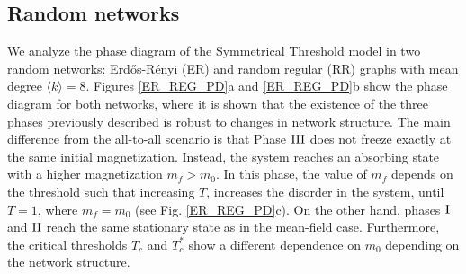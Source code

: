 \subsection{Random networks}

We analyze the phase diagram of the Symmetrical Threshold model in two random networks: Erd\H{o}s-Rényi (ER) \cite{erdos1960evolution} and random regular (RR) \cite{wormald_1999} graphs with mean degree $\langle k \rangle = 8$. Figures \ref{ER_REG_PD}a and \ref{ER_REG_PD}b show the phase diagram for both networks, where it is shown that the existence of the three phases previously described is robust to changes in network structure. The main difference from the all-to-all scenario is that Phase ${\rm III}$ does not freeze exactly at the same initial magnetization. Instead, the system reaches an absorbing state with a higher magnetization $m_f > m_0$. In this phase, the value of $m_f$ depends on the threshold such that increasing $T$, increases the disorder in the system, until $T = 1$, where $m_f = m_0$ (see Fig. \ref{ER_REG_PD}c). On the other hand, phases ${\rm I}$ and ${\rm II}$ reach the same stationary state as in the mean-field case. Furthermore, the critical thresholds $T_{c}$ and $T_{c}^{*}$ show a different dependence on $m_0$ depending on the network structure.
